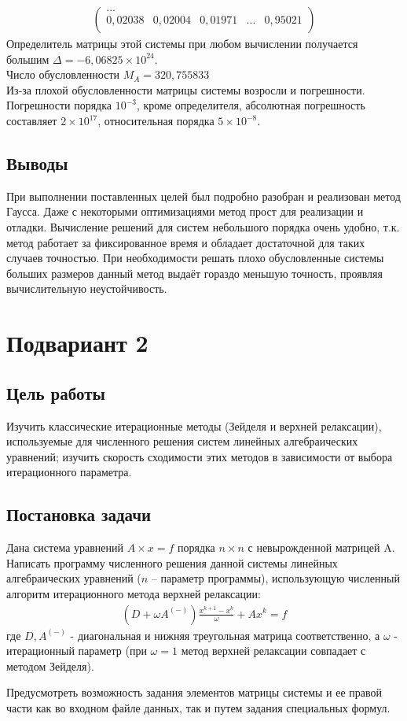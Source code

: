 \documentclass[a4paper,12pt,titlepage,finall]{article}
\begin{document}
\begin{enumerate}
\begin{align*}
\begin{pmatrix}
	...\\
	0,02038&     0,02004&     0,01971& ... &     0,95021 \\
\end{pmatrix}
\end{align*}
Определитель матрицы этой системы при любом вычислении получается большим $\Delta = -6,06825 \times 10^{24}$.\\
Число обусловленности $M_A = 320,755833$\\
Из-за плохой обусловленности матрицы системы возросли и погрешности. Погрешности порядка $10^{-3}$, кроме определителя, абсолютная погрешность составляет $2 \times 10^{17}$, относительная порядка $5 \times 10^{-8}$.
\end{enumerate}
\subsection{Выводы}
При выполнении поставленных целей был подробно разобран и реализован метод Гаусса. Даже с некоторыми оптимизациями метод прост для реализации и отладки. Вычисление решений для систем небольшого порядка очень удобно, т.к. метод работает за фиксированное время и обладает достаточной для таких случаев точностью. При необходимости решать плохо обусловленные системы больших размеров данный метод выдаёт гораздо меньшую точность, проявляя вычислительную неустойчивость.

\newpage
\section{Подвариант 2}
\subsection{Цель работы}
Изучить классические итерационные методы (Зейделя и верхней релаксации),
используемые для численного решения систем линейных алгебраических уравнений;
изучить скорость сходимости этих методов в зависимости от выбора итерационного
параметра.
\subsection{Постановка задачи}
Дана система уравнений $A \times x=f$ порядка $n \times n$ с невырожденной матрицей A. Написать
программу численного решения данной системы линейных алгебраических уравнений
($n$ – параметр программы), использующую численный алгоритм итерационного метода
верхней релаксации:
\begin{align*}
(D + \omega A^{(-)})\frac{x^{k+1}-x^k}{\omega} + Ax^k = f
\end{align*}
где $D, A^{(-)}$ - диагональная и нижняя треугольная матрица соответственно, а $\omega$ - итерационный параметр (при $\omega = 1$ метод верхней релаксации совпадает с методом Зейделя).
\par
Предусмотреть возможность задания элементов матрицы системы и ее правой части как
во входном файле данных, так и путем задания специальных формул.
\end{document}
